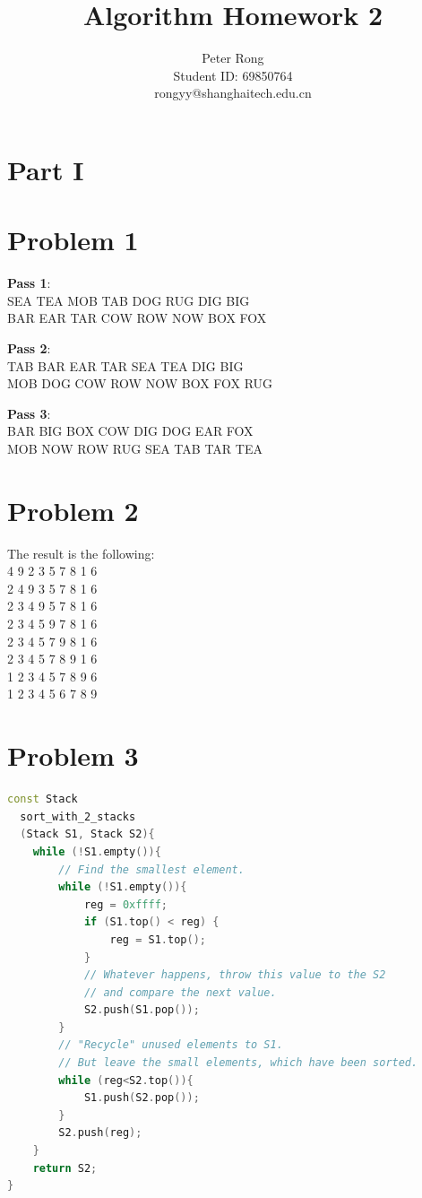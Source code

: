 \documentclass{article}
\title{Algorithm Homework 2}
\author{Peter Rong \\ Student ID: 69850764 \\ rongyy@shanghaitech.edu.cn}
\begin{document}
\maketitle
\section*{Part I}
\section*{Problem 1}
  \textbf{Pass 1}: \\
  SEA TEA MOB TAB DOG RUG DIG BIG \\
  BAR EAR TAR COW ROW NOW BOX FOX \\
  \par\textbf{Pass 2}: \\
  TAB BAR EAR TAR SEA TEA DIG BIG \\
  MOB DOG COW ROW NOW BOX FOX RUG \\
  \par\textbf{Pass 3}: \\
  BAR BIG BOX COW DIG DOG EAR FOX \\
  MOB NOW ROW RUG SEA TAB TAR TEA \\

\section*{Problem 2}
The result is the following: \\
4 9 2 3 5 7 8 1 6 \\
2 4 9 3 5 7 8 1 6 \\
2 3 4 9 5 7 8 1 6 \\
2 3 4 5 9 7 8 1 6 \\
2 3 4 5 7 9 8 1 6 \\
2 3 4 5 7 8 9 1 6 \\
1 2 3 4 5 7 8 9 6 \\
1 2 3 4 5 6 7 8 9 \\

\section*{Problem 3}
\begin{lstlisting}[language = C++]
const Stack 
  sort_with_2_stacks
  (Stack S1, Stack S2){
    while (!S1.empty()){
        // Find the smallest element.
        while (!S1.empty()){
            reg = 0xffff;
            if (S1.top() < reg) {
                reg = S1.top();
            }
            // Whatever happens, throw this value to the S2 
            // and compare the next value.
            S2.push(S1.pop());
        }
        // "Recycle" unused elements to S1. 
        // But leave the small elements, which have been sorted.
        while (reg<S2.top()){
            S1.push(S2.pop());
        }
        S2.push(reg);
    }
    return S2;
}
 \end{lstlisting}
\end{document}
